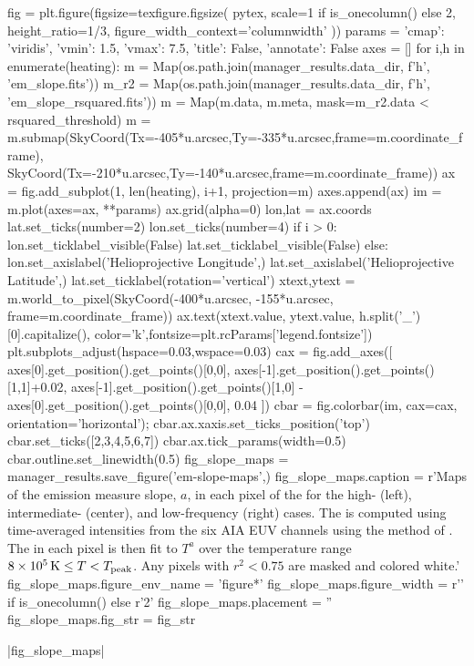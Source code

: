 \begin{pycode}
fig = plt.figure(figsize=texfigure.figsize(
    pytex,
    scale=1 if is_onecolumn() else 2,
    height_ratio=1/3,
    figure_width_context='columnwidth'
))
params = {'cmap': 'viridis', 'vmin': 1.5, 'vmax': 7.5, 'title': False, 'annotate': False}
axes = []
for i,h in enumerate(heating):
    m = Map(os.path.join(manager_results.data_dir, f'{h}', 'em_slope.fits'))
    m_r2 = Map(os.path.join(manager_results.data_dir, f'{h}', 'em_slope_rsquared.fits'))
    m = Map(m.data, m.meta, mask=m_r2.data < rsquared_threshold)
    m = m.submap(SkyCoord(Tx=-405*u.arcsec,Ty=-335*u.arcsec,frame=m.coordinate_frame),
                 SkyCoord(Tx=-210*u.arcsec,Ty=-140*u.arcsec,frame=m.coordinate_frame))
    ax = fig.add_subplot(1, len(heating), i+1, projection=m)
    axes.append(ax)
    im = m.plot(axes=ax, **params)
    ax.grid(alpha=0)
    lon,lat = ax.coords
    lat.set_ticks(number=2)
    lon.set_ticks(number=4)
    if i > 0:
        lon.set_ticklabel_visible(False)
        lat.set_ticklabel_visible(False)
    else:
        lon.set_axislabel('Helioprojective Longitude',)
        lat.set_axislabel('Helioprojective Latitude',)
        lat.set_ticklabel(rotation='vertical')
    xtext,ytext = m.world_to_pixel(SkyCoord(-400*u.arcsec, -155*u.arcsec, frame=m.coordinate_frame))
    ax.text(xtext.value, ytext.value, h.split('_')[0].capitalize(),
            color='k',fontsize=plt.rcParams['legend.fontsize'])
plt.subplots_adjust(hspace=0.03,wspace=0.03)
cax = fig.add_axes([
    axes[0].get_position().get_points()[0,0],
    axes[-1].get_position().get_points()[1,1]+0.02,
    axes[-1].get_position().get_points()[1,0] - axes[0].get_position().get_points()[0,0],
    0.04
])
cbar = fig.colorbar(im, cax=cax, orientation='horizontal');
cbar.ax.xaxis.set_ticks_position('top')
cbar.set_ticks([2,3,4,5,6,7])
cbar.ax.tick_params(width=0.5)
cbar.outline.set_linewidth(0.5)
fig_slope_maps = manager_results.save_figure('em-slope-maps',)
fig_slope_maps.caption = r'Maps of the emission measure slope, $a$, in each pixel of the \AR{} for the high- (left), intermediate- (center), and low-frequency (right) cases. The \dem{} is computed using time-averaged intensities from the six AIA EUV channels using the method of \citet{hannah_differential_2012}. The \dem{} in each pixel is then fit to $T^a$ over the temperature range $8\times10^{5}\,\textup{K}\le T< T_\textup{peak}$. Any pixels with $r^2<0.75$ are masked and colored white.'
fig_slope_maps.figure_env_name = 'figure*'
fig_slope_maps.figure_width = r'\columnwidth' if is_onecolumn() else r'2\columnwidth'
fig_slope_maps.placement = ''
fig_slope_maps.fig_str = fig_str
\end{pycode}
|fig_slope_maps|

